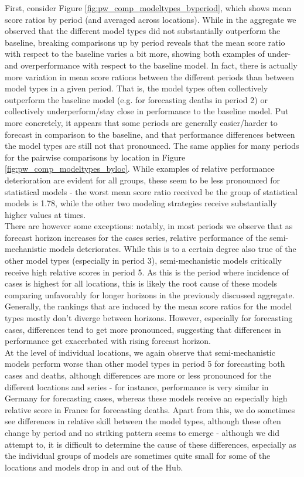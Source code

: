 First, consider Figure \ref{fig:pw_comp_modeltypes_byperiod}, which shows mean score ratios by period (and averaged across locations). While in the aggregate we observed that the different model types did not substantially outperform the baseline, breaking comparisons up by period reveals that the mean score ratio with respect to the baseline varies a bit more, showing both examples of under- and overperformance with respect to the baseline model. In fact, there is actually more variation in mean score rations between the different periods than between model types in a given period. That is, %
the model types often collectively outperform the baseline model (e.g. for forecasting deaths in period 2) or collectively underperform/stay close in performance to the baseline model. Put more concretely, it appears that some periods are generally easier/harder to forecast in comparison to the baseline, and that performance differences between the model types are still not that pronounced. The same applies for many periods for the pairwise comparisons by location in Figure \ref{fig:pw_comp_modeltypes_byloc}. While examples of relative performance deterioration are evident for all groups, these seem to be less pronounced for statistical models - the worst mean score ratio received be the group of statistical models is 1.78, while the other two modeling strategies receive substantially higher values at times.\\
There are however some exceptions: notably, in most periods we observe that as forecast horizon increases for the cases series, relative performance of the semi-mechanistic models deteriorates. While this is to a certain degree also true of the other model types (especially in period 3), semi-mechanistic models critically receive high relative scores in period 5. As this is the period where incidence of cases is highest for all locations, this is likely the root cause of these models comparing unfavorably for longer horizons in the previously discussed aggregate.\\
Generally, the rankings that are induced by the mean score ratios for the model types mostly don't diverge between horizons. However, especially for forecasting cases, differences tend to get more pronounced, suggesting that differences in performance get exacerbated with rising forecast horizon.\\
At the level of individual locations, we again observe that semi-mechanistic models perform worse than other model types in period 5 for forecasting both cases and deaths, although differences are more or less pronounced for the different locations and series - for instance, performance is very similar in Germany for forecasting cases, whereas these models receive an especially high relative score in France for forecasting deaths. Apart from this, we do sometimes see differences in relative skill between the model types, although these often change by period and no striking pattern seems to emerge - although we did attempt to, it is difficult to determine the cause of these differences, especially as the individual groups of models are sometimes quite small for some of the locations and models drop in and out of the Hub.\\
